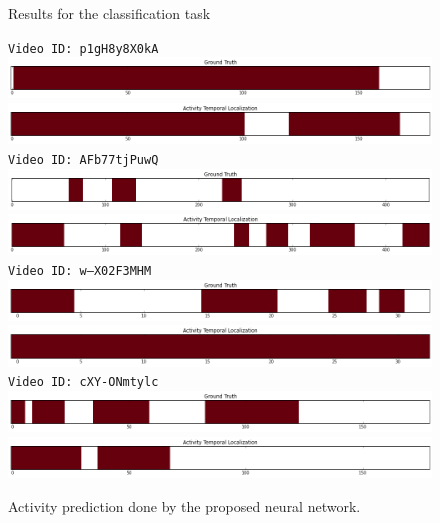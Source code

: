 \begin{figure}[H]
\caption{Results for the classification task}
\label{fig:results_visualization_classification}
\end{figure}


\begin{figure}[H]
\begin{center}
\texttt{Video ID: p1gH8y8X0kA}
\includegraphics[width=1\linewidth]{img/results/results_visualization_detection_a_1}
\includegraphics[width=1\linewidth]{img/results/results_visualization_detection_a_2}
\texttt{Video ID: AFb77tjPuwQ}
\includegraphics[width=1\linewidth]{img/results/results_visualization_detection_b_1}
\includegraphics[width=1\linewidth]{img/results/results_visualization_detection_b_2}
\texttt{Video ID: w--X02F3MHM}
\includegraphics[width=1\linewidth]{img/results/results_visualization_detection_c_1}
\includegraphics[width=1\linewidth]{img/results/results_visualization_detection_c_2}
\texttt{Video ID: cXY-ONmtylc}
\includegraphics[width=1\linewidth]{img/results/results_visualization_detection_d_1}
\includegraphics[width=1\linewidth]{img/results/results_visualization_detection_d_2}
\end{center}
\caption{Activity prediction done by the proposed neural network.}
\label{fig:results_visualization_detection}
\end{figure}

